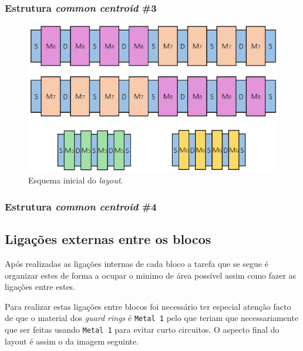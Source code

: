 \documentclass[11pt]{article}
\numberwithin{equation}{section}
\begin{document}
\subsubsection{Estrutura \textit{common centroid} \#3}

\begin{figure}[H]
	\centering
	\includegraphics[keepaspectratio=true, scale=0.30]{teoricas/layout/cc3_1}
	\vspace{-0.5em}
	\caption{Esquema inicial do \textit{layout}.}
	\vspace{-0.8em} 
\end{figure}

\subsubsection{Estrutura \textit{common centroid} \#4}

\subsection{Ligações externas entre os blocos}

Após realizadas as ligações internas de cada bloco a tarefa que se segue é organizar estes de forma a ocupar o minimo de área possível assim como fazer as ligações entre estes.

Para realizar estas ligações entre blocos foi necessário ter especial atenção facto de que o material dos \textit{guard rings} é \texttt{Metal 1} pelo que teriam que necessariamente que ser feitas usando \texttt{Metal 1} para evitar curto circuitos. O aspecto final do layout é assim o da imagem seguinte.
\end{document}
